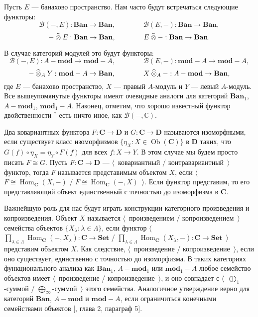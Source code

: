 Пусть $E$ --- банахово пространство. Нам часто будут встречаться следующие функторы:
$$
\mathcal{B}(-,E):\mathbf{Ban}\to\mathbf{Ban},
\qquad\qquad
\mathcal{B}(E,-):\mathbf{Ban}\to\mathbf{Ban},
$$
$$
-\mathbin{\widehat{\otimes}} E:\mathbf{Ban}\to\mathbf{Ban},
\qquad\qquad
E\mathbin{\widehat{\otimes}} -:\mathbf{Ban}\to\mathbf{Ban}.
$$

В случае категорий модулей это будут функторы:
$$
\mathcal{B}(-,E):A-\mathbf{mod}\to \mathbf{mod}-A,
\qquad\qquad
\mathcal{B}(E,-):\mathbf{mod}-A\to \mathbf{mod}-A,
$$
$$
-\mathbin{\widehat{\otimes}}_{A} Y:\mathbf{mod}-A\to\mathbf{Ban},
\qquad\qquad
X\mathbin{\widehat{\otimes}}_{A} -:A-\mathbf{mod}\to\mathbf{Ban},
$$
где $E$ --- банахово пространство, $X$ --- правый $A$-модуль и $Y$ --- левый $A$-модуль. Все вышеупомянутые функторы имеют очевидные аналоги для категорий $\mathbf{Ban}_1$, $A-\mathbf{mod}_1$, $\mathbf{mod}_1-A$. Наконец, отметим, что хорошо известный функтор двойственности ${}^*$ есть ничто иное, как $\mathcal{B}(-,\mathbb{C})$.

Два ковариантных функтора $F:\mathbf{C}\to\mathbf{D}$ и $G:\mathbf{C}\to\mathbf{D}$ называются изоморфными, если существует класс изоморфизмов $\{\eta_X:X\in\operatorname{Ob}(\mathbf{C})\}$ в $\mathbf{D}$ таких, что $G(f)\circ\eta_X=\eta_Y\circ F(f)$ для всех $f:X\to Y$. В этом случае мы будем просто писать $F\cong G$. Пусть $F:\mathbf{C}\to\mathbf{D}$ --- $\langle$~ковариантный / контравариантный~$\rangle$ функтор, тогда $F$ называется представимым объектом $X$, если $\langle$~$F\cong\operatorname{Hom}_{\mathbf{C}}(X,-)$ / $F\cong\operatorname{Hom}_{\mathbf{C}}(-,X)$~$\rangle$. Если функтор представим, то его представляющий объект единственный с точностью до изоморфизма в $\mathbf{C}$.

Важнейшую роль для нас будут играть конструкции категорного произведения и копроизведения. Объект $X$ называется $\langle$~произведением / копроизведением~$\rangle$ семейства объектов $\{X_\lambda:\lambda\in\Lambda\}$, если функтор $\langle$~$\prod_{\lambda\in\Lambda}\operatorname{Hom}_{\mathbf{C}}(-,X_{\lambda}):\mathbf{C}\to\mathbf{Set}$ / $\prod_{\lambda\in\Lambda}\operatorname{Hom}_{\mathbf{C}}(X_{\lambda},-):\mathbf{C}\to\mathbf{Set}$~$\rangle$ представим объектом $X$. Как следствие, $\langle$~произведение / копроизведение~$\rangle$, если оно существует, единственно с точностью до изоморфизма. В таких категориях функционального анализа как $\mathbf{Ban}_1$, $A-\mathbf{mod}_1$ или $\mathbf{mod}_1-A$ любое семейство объектов имеет $\langle$~произведение / копроизведение~$\rangle$, и оно совпадает с $\langle$~$\bigoplus_1$-суммой / $\bigoplus_\infty$-суммой~$\rangle$ этого семейства. Аналогичное утверждение верно для категорий $\mathbf{Ban}$, $A-\mathbf{mod}$ и $\mathbf{mod}-A$, если ограничиться конечными семействами объектов [\cite{HelLectAndExOnFuncAn}, глава 2, параграф 5].

